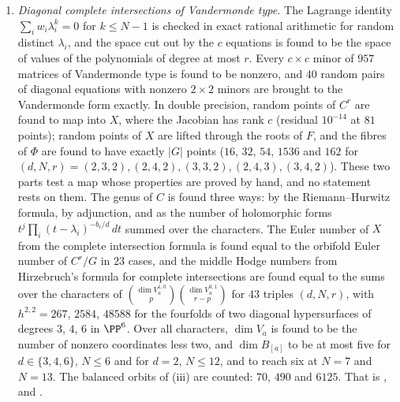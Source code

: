 \begin{enumerate}[label=\textup{(\Roman*)},leftmargin=*]
  the two terms reversed, and at $t=(2,5,7)$. Each piece is found to
  have $3$, $6$, $7$ partners of the other parity differing in one, two,
  three coordinates, the last with $D=16$ six times and $64$ once. In the
  explicit convolution the $112$ groups $\cH^{3}$ of pieces that differ
  everywhere, $2560$ classes, are found to be reached by no element of
  degree one and to have no target of degree three, and the same is found
  for every such pair with adjacent shifts in $36$ random orders and shifts
  of the three placements of . That is
  , ,
  ,  and
  .

\item \emph{Diagonal complete intersections of Vandermonde type.} The
  Lagrange identity $\sum_{i}w_{i}\lambda_{i}^{k}=0$ for $k\le N-1$ is checked
  in exact rational arithmetic for random distinct $\lambda_{i}$, and the
  space cut out by the $c$ equations is found to be the space of values of
  the polynomials of degree at most $r$. Every $c\times c$ minor of $957$
  matrices of Vandermonde type is found to be nonzero, and $40$ random pairs
  of diagonal equations with nonzero $2\times2$ minors are brought to the
  Vandermonde form exactly. In double precision, random points of $C^{r}$
  are found to map into $X$, where the Jacobian has rank $c$ (residual
  $10^{-14}$ at $81$ points); random points of $X$ are lifted through the
  roots of $F$, and the fibres of $\Phi$ are found to have exactly $|G|$
  points ($16$, $32$, $54$, $1536$ and $162$ for
  $(d,N,r)=(2,3,2),(2,4,2),(3,3,2),(2,4,3),(3,4,2)$). These two parts test
  a map whose properties are proved by hand, and no statement rests on
  them. The genus of $C$ is found three ways: by the Riemann--Hurwitz formula,
  by adjunction, and as the number of holomorphic forms
  $t^{j}\prod_{i}(t-\lambda_{i})^{-b_{i}/d}\,dt$ summed over the characters.
  The Euler number of $X$ from the complete intersection formula is found
  equal to the orbifold Euler number of $C^{r}/G$ in $23$ cases, and the
  middle Hodge numbers from Hirzebruch's formula for complete intersections
  are found equal to the sums over the characters of
  $\binom{\dim V_{a}^{1,0}}{p}\binom{\dim V_{a}^{0,1}}{r-p}$ for $43$ triples
  $(d,N,r)$, with $h^{2,2}=267$, $2584$, $48588$ for the fourfolds of two
  diagonal hypersurfaces of degrees $3$, $4$, $6$ in $\PP^{6}$. Over all
  characters, $\dim V_{a}$ is found to be the number of nonzero coordinates
  less two, and $\dim B_{[a]}$ to be at most five for $d\in\{3,4,6\}$,
  $N\le6$ and for $d=2$, $N\le12$, and to reach six at $N=7$ and $N=13$. The balanced orbits of
  (iii) are counted: $70$, $490$ and $6125$. That is
  ,  and
  .


\end{enumerate}
